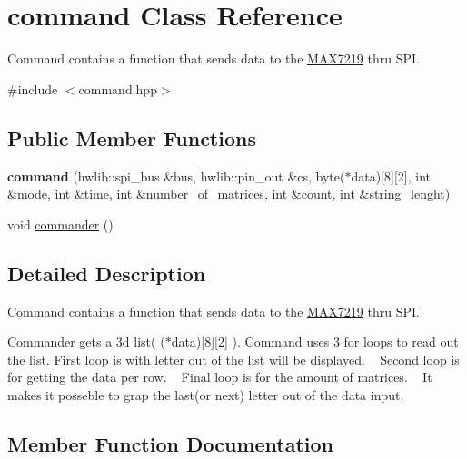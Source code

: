 \hypertarget{classcommand}{}\section{command Class Reference}
\label{classcommand}


Command contains a function that sends data to the \hyperlink{class_m_a_x7219}{M\+A\+X7219} thru S\+PI.  




{\ttfamily \#include $<$command.\+hpp$>$}

\subsection*{Public Member Functions}
\begin{DoxyCompactItemize}
\item 
{\bfseries command} (hwlib\+::spi\+\_\+bus \&bus, hwlib\+::pin\+\_\+out \&cs, byte($\ast$data)\mbox{[}8\mbox{]}\mbox{[}2\mbox{]}, int \&mode, int \&time, int \&number\+\_\+of\+\_\+matrices, int \&count, int \&string\+\_\+lenght)\hypertarget{classcommand_ad0e013b59d77a5be8e2f86c4e3cb13c0}{}\label{classcommand_ad0e013b59d77a5be8e2f86c4e3cb13c0}

\item 
void \hyperlink{classcommand_a1559447538e976b00620f91d811061e7}{commander} ()
\end{DoxyCompactItemize}


\subsection{Detailed Description}
Command contains a function that sends data to the \hyperlink{class_m_a_x7219}{M\+A\+X7219} thru S\+PI. 

Commander gets a 3d list( ($\ast$data)\mbox{[}8\mbox{]}\mbox{[}2\mbox{]} ). Command uses 3 for loops to read out the list. First loop is with letter out of the list will be displayed. ~\newline
Second loop is for getting the data per row. ~\newline
Final loop is for the amount of matrices. ~\newline
It makes it posseble to grap the last(or next) letter out of the data input. ~\newline
 

\subsection{Member Function Documentation}
